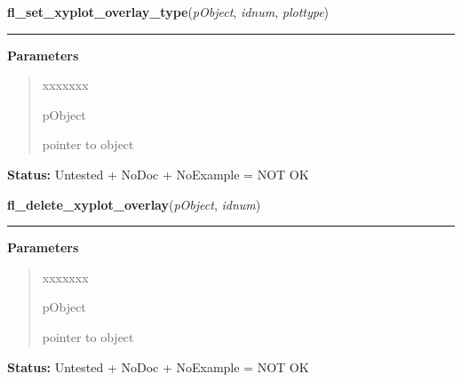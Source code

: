 \hspace{.8\funcindent}\begin{boxedminipage}{\funcwidth}

    \raggedright \textbf{fl\_set\_xyplot\_overlay\_type}(\textit{pObject}, \textit{idnum}, \textit{plottype})

    \vspace{-1.5ex}

    \rule{\textwidth}{0.5\fboxrule}
\setlength{\parskip}{2ex}
\setlength{\parskip}{1ex}
      \textbf{Parameters}
      \vspace{-1ex}

      \begin{quote}
        \begin{Ventry}{xxxxxxx}

          \item[pObject]

          pointer to object

        \end{Ventry}

      \end{quote}

\textbf{Status:} Untested + NoDoc + NoExample = NOT OK



    \end{boxedminipage}

    \label{xformslib:library:fl_delete_xyplot_overlay}

    \vspace{0.5ex}

\hspace{.8\funcindent}\begin{boxedminipage}{\funcwidth}

    \raggedright \textbf{fl\_delete\_xyplot\_overlay}(\textit{pObject}, \textit{idnum})

    \vspace{-1.5ex}

    \rule{\textwidth}{0.5\fboxrule}
\setlength{\parskip}{2ex}
\setlength{\parskip}{1ex}
      \textbf{Parameters}
      \vspace{-1ex}

      \begin{quote}
        \begin{Ventry}{xxxxxxx}

          \item[pObject]

          pointer to object

        \end{Ventry}

      \end{quote}

\textbf{Status:} Untested + NoDoc + NoExample = NOT OK



    \end{boxedminipage}

